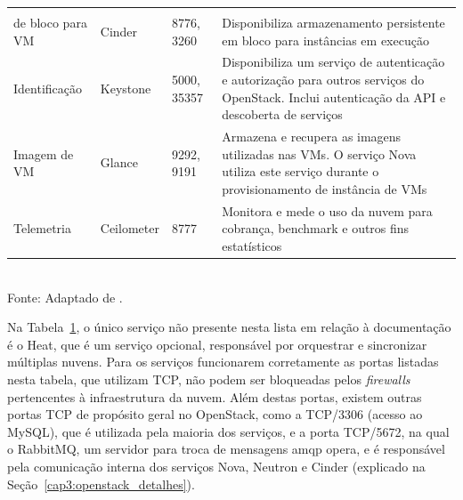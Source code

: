\begin{table}[!htb]
\begin{tabularx}{1\textwidth}{lllX}
\begin{tabular}[c]{@{}l@{}}Armazenamento\\ de bloco para VM\end{tabular} & Cinder                                                             & 8776, 3260                                                          & Disponibiliza armazenamento persistente em bloco para instâncias em execução                                                                                                      \\
\rowcolor[HTML]{EFEFEF} 
Identificação                                                            & Keystone                                                           & 5000, 35357                                                         & Disponibiliza um serviço de autenticação e autorização para outros serviços do OpenStack. Inclui autenticação da API e descoberta de serviços                                     \\
Imagem de VM                                                             & Glance                                                             & 9292, 9191                                                          & Armazena e recupera as imagens utilizadas nas VMs. O serviço Nova utiliza este serviço durante o provisionamento de instância de VMs                                              \\
\rowcolor[HTML]{EFEFEF} 
Telemetria                                                               & Ceilometer                                                         & 8777                                                                & Monitora e mede o uso da nuvem para cobrança, benchmark e outros fins estatísticos                                                                                                \\ \hline
\end{tabularx}
\label{tab:openstack_service_list}\\
Fonte: Adaptado de \cite{openstack:newton}.
\end{table}


Na Tabela~\ref{tab:openstack_service_list}, o único serviço não presente nesta lista em relação à documentação é o Heat, que é um serviço opcional, responsável por orquestrar e sincronizar múltiplas nuvens.
%
Para os serviços funcionarem corretamente as portas listadas nesta tabela, que utilizam TCP, não podem ser bloqueadas pelos \textit{firewalls} pertencentes à infraestrutura da nuvem.
%
Além destas portas, existem outras portas TCP de propósito geral no OpenStack, como a TCP/3306 (acesso ao MySQL), que é utilizada pela maioria dos serviços, e a porta TCP/5672, na qual o RabbitMQ, um servidor para troca de mensagens \ac{amqp} opera, e é responsável pela comunicação interna dos serviços Nova, Neutron e Cinder (explicado na Seção~\ref{cap3:openstack_detalhes}).


